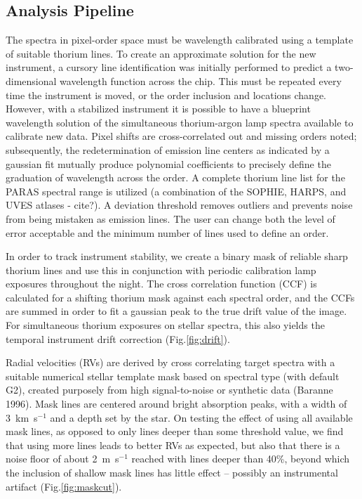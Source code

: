\documentclass[12pt,preprint]{emulateapj}
\begin{document}
\subsection{Analysis Pipeline}

The spectra in pixel-order space must be wavelength calibrated using a template of suitable thorium lines. To create an approximate solution for the new instrument, a cursory line identification was initially performed to predict a two-dimensional wavelength function across the chip. This must be repeated every time the instrument is moved, or the order inclusion and locations change. However, with a stabilized instrument it is possible to have a blueprint wavelength solution of the simultaneous thorium-argon lamp spectra available to calibrate new data. Pixel shifts are cross-correlated out and missing orders noted; subsequently, the redetermination of emission line centers as indicated by a gaussian fit mutually produce polynomial coefficients to precisely define the graduation of wavelength across the order. A complete thorium line list for the PARAS spectral range is utilized (a combination of the SOPHIE, HARPS, and UVES atlases - cite?). A deviation threshold removes outliers and prevents noise from being mistaken as emission lines. The user can change both the level of error acceptable and the minimum number of lines used to define an order. 

In order to track instrument stability, we create a binary mask of reliable sharp thorium lines and use this in conjunction with periodic calibration lamp exposures throughout the night. The cross correlation function (CCF) is calculated for a shifting thorium mask against each spectral order, and the CCFs are summed in order to fit a gaussian peak to the true drift value of the image. For simultaneous thorium exposures on stellar spectra, this also yields the temporal instrument drift correction (Fig.\ref{fig:drift}). 

Radial velocities (RVs) are derived by cross correlating target spectra with a suitable numerical stellar template mask based on spectral type (with default G2), created purposely from high signal-to-noise or synthetic data (Baranne 1996). Mask lines are centered around bright absorption peaks, with a width of 3~km~s$^{-1}$ and a depth set by the star. On testing the effect of using all available mask lines, as opposed to only lines deeper than some threshold value, we find that using more lines leads to better RVs as expected, but also that there is a noise floor of about 2~m~s$^{-1}$ reached with lines deeper than 40\%, beyond which the inclusion of shallow mask lines has little effect -- possibly an instrumental artifact (Fig.\ref{fig:maskcut}).
\end{document}
